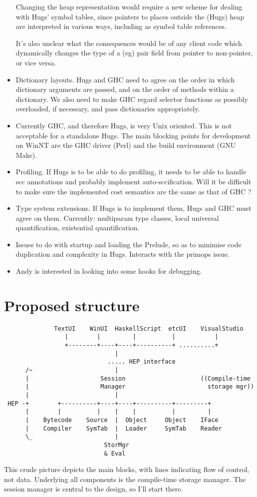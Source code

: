 \begin{itemize}
  Changing the heap representation would require a new scheme
  for dealing with Hugs' symbol tables, since pointers to places
  outside the (Hugs) heap are interpreted in various ways, including
  as symbol table references.

  It's also unclear what the consequences would be of any client
  code which dynamically changes the type of a (eg) pair field
  from pointer to non-pointer, or vice versa.
\item 
  Dictionary layouts.  Hugs and GHC need to agree on the order
  in which dictionary arguments are passed, and on the order of
  methods within a dictionary.  We also need to make GHC regard
  selector functions as possibly overloaded, if necessary,
  and pass dictionaries appropriately.
\item
  Currently GHC, and therefore Hugs, is very Unix oriented.  This
  is not acceptable for a standalone Hugs.  The main blocking points for
  development on WinNT are the GHC driver (Perl) and the
  build environment (GNU Make).
\item
  Profiling.  If Hugs is to be able to do profiling,
  it needs to be able to handle scc annotations and probably implement
  auto-sccification.  Will it be difficult to make sure the
  implemented cost semantics are the same as that of GHC ?
\item 
  Type system extensions.  If Hugs is to implement them, Hugs and
  GHC must agree on them.  Currently: multiparam type classes, 
  local universal quantification, existential quantification.
\item 
  Issues to do with startup and loading the Prelude, so as
  to minimise code duplication and complexity in Hugs.
  Interacts with the primops issue.
\item
  Andy is interested in looking into some hooks for debugging.
\end{itemize}


\section{Proposed structure}
\begin{verbatim}
              TextUI    WinUI  HaskellScript  etcUI    VisualStudio
                 |        |         |          |           |
                 +--------+----+----+----------+ ..........+
                               |
                             ..... HEP interface
      /~                       |
      |                    Session                     ((Compile-time
      |                    Manager                       storage mgr))
      |                        |
 HEP -+        +----------+----+----+----------+---------+
      |        |          |    |    |          |         |
      |    Bytecode    Source  |  Object     Object    IFace
      |    Compiler    SymTab  |  Loader     SymTab    Reader
      \_                       |
                            StorMgr
                            & Eval
\end{verbatim}
This crude picture depicts the main blocks, with lines indicating flow
of control, not data.  Underlying all components is the compile-time
storage manager.  The session manager is central to the design, so
I'll start there.

